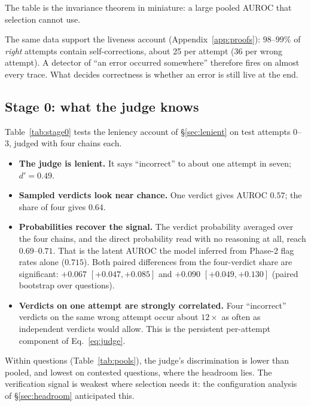 The table is the invariance theorem in miniature: a large pooled AUROC that selection cannot use.

The same data support the liveness account (Appendix~\ref{app:proofs}): $98$--$99\%$ of \emph{right} attempts contain
self-corrections, about 25 per attempt (36 per wrong attempt). A detector of ``an error occurred somewhere'' therefore
fires on almost every trace. What decides correctness is whether an error is still live at the end.



\subsection{Stage 0: what the judge knows}
\label{sec:stage0}

Table~\ref{tab:stage0} tests the leniency account of \S\ref{sec:lenient} on test attempts 0--3, judged with four
chains each.

\begin{itemize}
\item \textbf{The judge is lenient.} It says ``incorrect'' to about one attempt in seven; $d'=0.49$.
\item \textbf{Sampled verdicts look near chance.} One verdict gives AUROC $0.57$; the share of four gives $0.64$.
\item \textbf{Probabilities recover the signal.} The verdict probability averaged over the four chains, and the
  direct probability read with no reasoning at all, reach $0.69$--$0.71$. That is the latent AUROC the model
  inferred from Phase-2 flag rates alone ($0.715$). Both paired differences from the four-verdict share are
  significant: $+0.067$ $[+0.047, +0.085]$ and $+0.090$ $[+0.049, +0.130]$ (paired bootstrap over questions).
\item \textbf{Verdicts on one attempt are strongly correlated.} Four ``incorrect'' verdicts on the same wrong attempt
  occur about $12\times$ as often as independent verdicts would allow. This is the persistent per-attempt component
  of Eq.~\ref{eq:judge}.
\end{itemize}

Within questions (Table~\ref{tab:pools}), the judge's discrimination is lower than pooled, and lowest on contested
questions, where the headroom lies. The verification signal is weakest where selection needs it: the configuration
analysis of \S\ref{sec:headroom} anticipated this.




